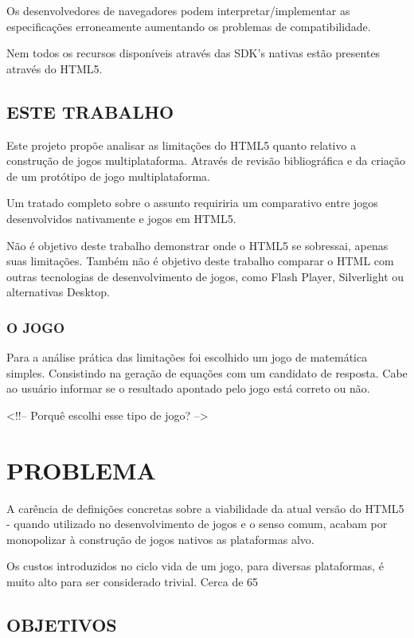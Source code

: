 \documentclass[11pt,a4paper]{article}
\begin{document}
Os desenvolvedores de navegadores podem interpretar/implementar as especificações erroneamente aumentando os problemas de compatibilidade.

Nem todos os recursos disponíveis através das SDK's nativas estão presentes através do HTML5.

\section{ ESTE TRABALHO}

Este projeto propõe analisar as limitações do HTML5 quanto relativo a construção de jogos multiplataforma. Através de revisão bibliográfica e da criação de um protótipo de jogo multiplataforma.

Um tratado completo sobre o assunto requiriria um comparativo entre jogos desenvolvidos nativamente e jogos em HTML5.

Não é objetivo deste trabalho demonstrar onde o HTML5 se sobressai, apenas suas limitações.
Também não é objetivo deste trabalho comparar o HTML com outras tecnologias de desenvolvimento de jogos, como Flash Player, Silverlight ou alternativas Desktop.

\subsection{O JOGO}

Para a análise prática das limitações foi escolhido um jogo de matemática simples. Consistindo na geração de equações com um candidato de resposta. Cabe ao usuário informar se o resultado apontado pelo jogo está correto ou não.

<!!-- Porquê escolhi esse tipo de jogo? -->

\chapter{PROBLEMA}
A carência de definições concretas sobre a viabilidade da atual versão do HTML5 - quando utilizado no desenvolvimento de jogos e o senso comum, acabam por monopolizar à construção de jogos nativos as plataformas alvo.

Os custos introduzidos no ciclo vida de um jogo, para diversas plataformas, é muito alto para ser considerado trivial. Cerca de 65%

\section{ OBJETIVOS}
\end{document}
